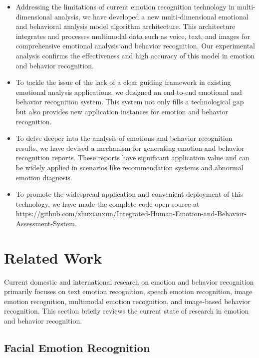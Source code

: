 \documentclass[preprint,12pt]{elsarticle}
\begin{document}
\begin{itemize}
    \item Addressing the limitations of current emotion recognition technology in multi-dimensional analysis, we have developed a new multi-dimensional emotional and behavioral analysis model algorithm architecture. This architecture integrates and processes multimodal data such as voice, text, and images for comprehensive emotional analysis and behavior recognition. Our experimental analysis confirms the effectiveness and high accuracy of this model in emotion and behavior recognition.
    \item To tackle the issue of the lack of a clear guiding framework in existing emotional analysis applications, we designed an end-to-end emotional and behavior recognition system. This system not only fills a technological gap but also provides new application instances for emotion and behavior recognition.
    \item To delve deeper into the analysis of emotions and behavior recognition results, we have devised a mechanism for generating emotion and behavior recognition reports. These reports have significant application value and can be widely applied in scenarios like recommendation systems and abnormal emotion diagnosis.
    \item To promote the widespread application and convenient deployment of this technology, we have made the complete code open-source at https://github.com/zhuxianxun/Integrated-Human-Emotion-and-Behavior-Assessment-System.
\end{itemize}

\section{Related Work}
Current domestic and international research on emotion and behavior recognition primarily focuses on text emotion recognition, speech emotion recognition, image emotion recognition, multimodal emotion recognition, and image-based behavior recognition. This section briefly reviews the current state of research in emotion and behavior recognition.

\subsection{Facial Emotion Recognition}
\end{document}
